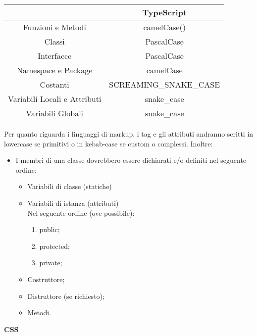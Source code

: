 \documentclass[a4paper, 12pt]{article}
\begin{document}
\begin{center}
\begin{tabular}{|| c || c ||}
    \hline
        & TypeScript \\
    \hline \hline
    Funzioni e Metodi & camelCase() \\
    \hline
    Classi & PascalCase \\
    \hline
    Interfacce & PascalCase \\
    \hline
    Namespace e Package & camelCase \\
    \hline
    Costanti & SCREAMING\_SNAKE\_CASE \\
    \hline  
    Variabili Locali e Attributi & snake\_case \\
    \hline
    Variabili Globali & snake\_case \\
    \hline
\end{tabular}
\end{center}
\vspace*{0.5cm}
Per quanto riguarda i linguaggi di markup, i tag e gli attributi andranno scritti in lowercase se primitivi o in kebab-case se custom o complessi. \newline
Inoltre:
\begin{itemize}
    \item I membri di una classe dovrebbero essere dichiarati e/o definiti nel seguente ordine:
    \begin{itemize}
        \item Variabili di classe (statiche)
        \item Variabili di istanza (attributi) \\
        Nel seguente ordine (ove possibile):
        \begin{enumerate}
            \item public;
            \item protected;
            \item private;
        \end{enumerate}
        \item Costruttore;
        \item Distruttore (se richiesto);
        \item Metodi.
    \end{itemize}
\end{itemize}
\textbf{CSS}
\end{document}
